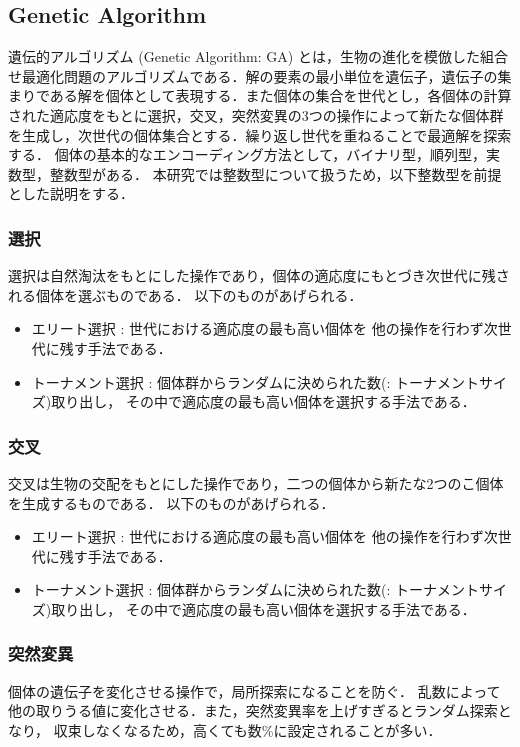 \changeindent{0cm}
\subsection{Genetic Algorithm}
\changeindent{2cm}
遺伝的アルゴリズム (Genetic Algorithm: GA)\cite{whitley1994genetic} とは，生物の進化を模倣した組合せ最適化問題のアルゴリズムである．解の要素の最小単位を遺伝子，遺伝子の集まりである解を個体として表現する．また個体の集合を世代とし，各個体の計算された適応度をもとに選択，交叉，突然変異の3つの操作によって新たな個体群を生成し，次世代の個体集合とする．繰り返し世代を重ねることで最適解を探索する．
個体の基本的なエンコーディング方法として，バイナリ型，順列型，実数型，整数型がある．
本研究では整数型について扱うため，以下整数型を前提とした説明をする．

\changeindent{0cm}
\subsubsection{選択}
\changeindent{2cm}
選択は自然淘汰をもとにした操作であり，個体の適応度にもとづき次世代に残される個体を選ぶものである．
以下のものがあげられる．
\begin{itemize}
	\item エリート選択\cite{murata1996multi} : 世代における適応度の最も高い個体を
	他の操作を行わず次世代に残す手法である．
	\item トーナメント選択 : 個体群からランダムに決められた数(: トーナメントサイズ)取り出し，
	その中で適応度の最も高い個体を選択する手法である．
\end{itemize}

\changeindent{0cm}
\subsubsection{交叉}
\changeindent{2cm}
交叉は生物の交配をもとにした操作であり，二つの個体から新たな2つのこ個体を生成するものである．
以下のものがあげられる．
\begin{itemize}
	\item エリート選択\cite{murata1996multi} : 世代における適応度の最も高い個体を
	他の操作を行わず次世代に残す手法である．
	\item トーナメント選択 : 個体群からランダムに決められた数(: トーナメントサイズ)取り出し，
	その中で適応度の最も高い個体を選択する手法である．
\end{itemize}

\changeindent{0cm}
\subsubsection{突然変異}
\changeindent{2cm}
個体の遺伝子を変化させる操作で，局所探索になることを防ぐ．
乱数によって他の取りうる値に変化させる．また，突然変異率を上げすぎるとランダム探索となり，
収束しなくなるため，高くても数\%に設定されることが多い．



